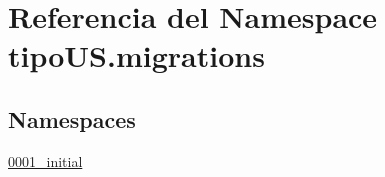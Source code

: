 \hypertarget{namespacetipo_u_s_1_1migrations}{}\section{Referencia del Namespace tipo\+U\+S.\+migrations}
\label{namespacetipo_u_s_1_1migrations}
\subsection*{Namespaces}
\begin{DoxyCompactItemize}
\item 
 \hyperlink{namespacetipo_u_s_1_1migrations_1_10001__initial}{0001\+\_\+initial}
\end{DoxyCompactItemize}
